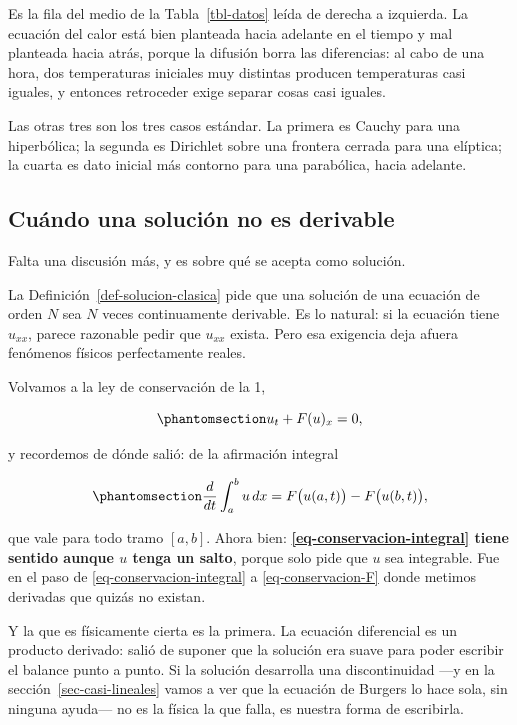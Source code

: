 \documentclass[
  spanish,
  a4paper,
]{scrbook}
\theoremstyle{definition}
\theoremstyle{plain}
\theoremstyle{definition}
\theoremstyle{plain}
\theoremstyle{definition}
\theoremstyle{remark}
\begin{document}
Es la fila del medio de la Tabla~\ref{tbl-datos} leída de derecha a
izquierda. La ecuación del calor está bien planteada hacia adelante en
el tiempo y mal planteada hacia atrás, porque la difusión borra las
diferencias: al cabo de una hora, dos temperaturas iniciales muy
distintas producen temperaturas casi iguales, y entonces retroceder
exige separar cosas casi iguales.

Las otras tres son los tres casos estándar. La primera es Cauchy para
una hiperbólica; la segunda es Dirichlet sobre una frontera cerrada para
una elíptica; la cuarta es dato inicial más contorno para una
parabólica, hacia adelante.

\subsection{Cuándo una solución no es
derivable}\label{sec-generalizadas}

Falta una discusión más, y es sobre qué se acepta como solución.

La Definición~\ref{def-solucion-clasica} pide que una solución de una
ecuación de orden \(N\) sea \(N\) veces continuamente derivable. Es lo
natural: si la ecuación tiene \(u_{xx}\), parece razonable pedir que
\(u_{xx}\) exista. Pero esa exigencia deja afuera fenómenos físicos
perfectamente reales.

Volvamos a la ley de conservación de la 1,

\begin{equation}\protect\phantomsection\label{eq-conservacion-F}{
u_t + F(u)_x = 0 ,
}\end{equation}

y recordemos de dónde salió: de la afirmación integral

\begin{equation}\protect\phantomsection\label{eq-conservacion-integral}{
\frac{d}{dt}\int_a^b u\,dx = F\big(u(a,t)\big) - F\big(u(b,t)\big) ,
}\end{equation}

que vale para todo tramo \([a,b]\). Ahora bien:
\textbf{\ref{eq-conservacion-integral} tiene sentido aunque \(u\) tenga
un salto}, porque solo pide que \(u\) sea integrable. Fue en el paso de
\ref{eq-conservacion-integral} a \ref{eq-conservacion-F} donde metimos
derivadas que quizás no existan.

Y la que es físicamente cierta es la primera. La ecuación diferencial es
un producto derivado: salió de suponer que la solución era suave para
poder escribir el balance punto a punto. Si la solución desarrolla una
discontinuidad ---y en la sección~\ref{sec-casi-lineales} vamos a ver
que la ecuación de Burgers lo hace sola, sin ninguna ayuda--- no es la
física la que falla, es nuestra forma de escribirla.
\end{document}
